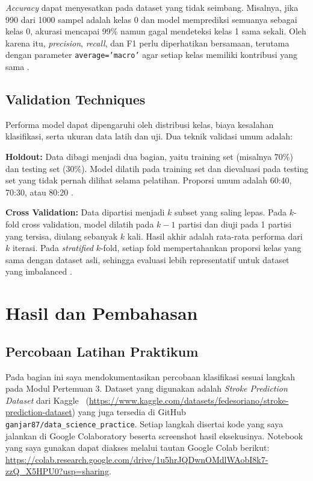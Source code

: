 \documentclass[a4paper,oneside,12pt]{report}
\newcommand{\tocboldsection}[1]{%
  \protect\renewcommand{\protect\cftchapfont}{\protect\bfseries}%
  #1%
  \protect\renewcommand{\protect\cftchapfont}{}%
}
\begin{document}
\textit{Accuracy} dapat menyesatkan pada dataset yang tidak seimbang. Misalnya, jika 990 dari 1000 sampel adalah kelas 0 dan model memprediksi semuanya sebagai kelas 0, akurasi mencapai 99\% namun gagal mendeteksi kelas 1 sama sekali. Oleh karena itu, \textit{precision}, \textit{recall}, dan F1 perlu diperhatikan bersamaan, terutama dengan parameter \texttt{average='macro'} agar setiap kelas memiliki kontribusi yang sama \cite{sklearn-metrics,han2022}.

\section{Validation Techniques}
Performa model dapat dipengaruhi oleh distribusi kelas, biaya kesalahan klasifikasi, serta ukuran data latih dan uji. Dua teknik validasi umum adalah:

\textbf{Holdout:} Data dibagi menjadi dua bagian, yaitu training set (misalnya 70\%) dan testing set (30\%). Model dilatih pada training set dan dievaluasi pada testing set yang tidak pernah dilihat selama pelatihan. Proporsi umum adalah 60:40, 70:30, atau 80:20 \cite{han2022}.

\textbf{Cross Validation:} Data dipartisi menjadi $k$ subset yang saling lepas. Pada $k$-fold cross validation, model dilatih pada $k-1$ partisi dan diuji pada 1 partisi yang tersisa, diulang sebanyak $k$ kali. Hasil akhir adalah rata-rata performa dari $k$ iterasi. Pada \textit{stratified} $k$-fold, setiap fold mempertahankan proporsi kelas yang sama dengan dataset asli, sehingga evaluasi lebih representatif untuk dataset yang imbalanced \cite{sklearn-cross-validation,dicoding-workflow,digitalskola-preprocessing}.

\clearpage

\chapter[\tocboldsection{Hasil dan Pembahasan}]{Hasil dan Pembahasan}

\section{Percobaan Latihan Praktikum}
Pada bagian ini saya mendokumentasikan percobaan klasifikasi sesuai langkah pada Modul Pertemuan 3. Dataset yang digunakan adalah \textit{Stroke Prediction Dataset} dari Kaggle~\cite{kaggle-stroke} (\url{https://www.kaggle.com/datasets/fedesoriano/stroke-prediction-dataset}) yang juga tersedia di GitHub \texttt{ganjar87/data\_science\_practice}. Setiap langkah disertai kode yang saya jalankan di Google Colaboratory beserta screenshot hasil eksekusinya. Notebook yang saya gunakan dapat diakses melalui tautan Google Colab berikut: \url{https://colab.research.google.com/drive/1u5hrJQDwnOMdlWAobI8k7-zzQ_X5HPU0?usp=sharing}.
\end{document}
